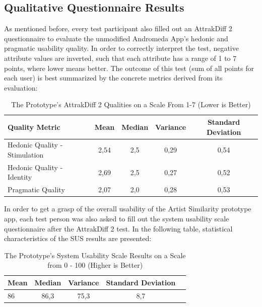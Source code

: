 \subsection{Qualitative Questionnaire Results}
\label{sec:qualitative-questionnaire-results}

As mentioned before, every test participant also filled out an AttrakDiff 2 questionnaire to evaluate the unmodified Andromeda App's hedonic and pragmatic usability quality. In order to correctly interpret the test, negative attribute values are inverted, such that each attribute has a range of 1 to 7 points, where lower means better. The outcome of this test (sum of all points for each user) is best summarized by the concrete metrics derived from its evaluation:

\begin{table}[H]
\begin{center}
\begin{tabular}{ | l | c | c | c | c |}
	\hline
	\textbf{Quality Metric} & \textbf{Mean} & \textbf{Median} & \textbf{Variance} & \textbf{Standard Deviation}\\ \hline
	Hedonic Quality - Stimulation & 2,54 & 2,5 & 0,29 & 0,54 \\ \hline
	Hedonic Quality - Identity & 2,69 & 2,5 & 0,27 & 0,52 \\ \hline
	Pragmatic Quality & 2,07 & 2,0 & 0,28 & 0,53 \\ \hline
\end{tabular}
\caption {The Prototype's AttrakDiff 2 Qualities on a Scale From 1-7 (Lower is Better)} \label{tab:attrakdiff} 
\end{center}
\end{table}

In order to get a grasp of the overall usability of the Artist Similarity prototype app, each test person was also asked to fill out the system usability scale questionnaire after the AttrakDiff 2 test. In the following table, statistical characteristics of the SUS results are presented:

\begin{table}[H]
\begin{center}
\begin{tabular}{ | l | c | c | c | c |}
	\hline
	\textbf{Mean} & \textbf{Median} & \textbf{Variance} & \textbf{Standard Deviation}\\ \hline
	86 & 86,3 & 75,3 & 8,7 \\ \hline
\end{tabular}
\caption {The Prototype's System Usability Scale Results on a Scale from 0 - 100 (Higher is Better)} \label{tab:sus} 
\end{center}
\end{table}

